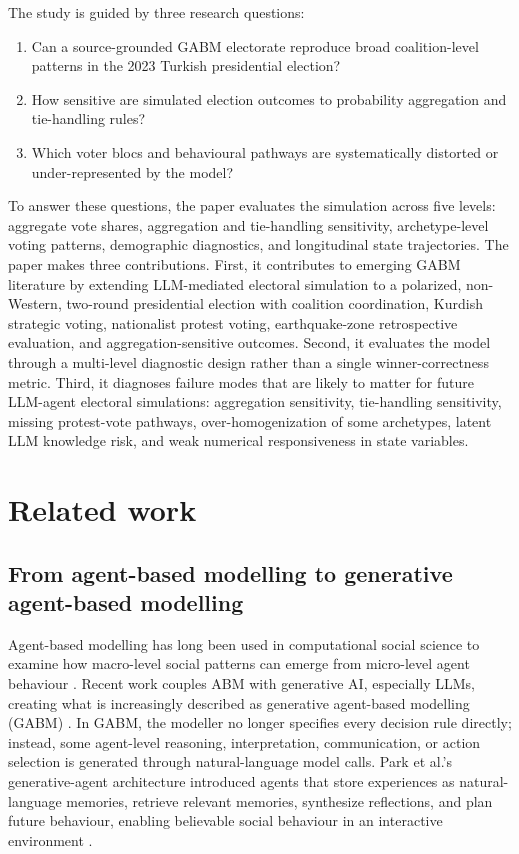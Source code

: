\documentclass[pdflatex,sn-mathphys-num,iicol]{sn-jnl}
\begin{document}
The study is guided by three research questions:
\begin{enumerate}
\item Can a source-grounded GABM electorate reproduce broad coalition-level
      patterns in the 2023 Turkish presidential election?
\item How sensitive are simulated election outcomes to probability aggregation
      and tie-handling rules?
\item Which voter blocs and behavioural pathways are systematically distorted
      or under-represented by the model?
\end{enumerate}
To answer these questions, the paper evaluates the simulation across five
levels: aggregate vote shares, aggregation and tie-handling sensitivity,
archetype-level voting patterns, demographic diagnostics, and longitudinal state
trajectories. The paper makes three contributions. First, it contributes to
emerging GABM literature by extending LLM-mediated electoral simulation to a
polarized, non-Western, two-round presidential election with coalition
coordination, Kurdish strategic voting, nationalist protest voting,
earthquake-zone retrospective evaluation, and aggregation-sensitive outcomes.
Second, it evaluates the model through a multi-level diagnostic design rather
than a single winner-correctness metric. Third, it diagnoses failure modes that
are likely to matter for future LLM-agent electoral simulations: aggregation
sensitivity, tie-handling sensitivity, missing protest-vote pathways,
over-homogenization of some archetypes, latent LLM knowledge risk, and weak
numerical responsiveness in state variables.


\section{Related work}\label{sec:related}

\subsection{From agent-based modelling to generative agent-based
modelling}\label{subsec:abm-to-gabm}

Agent-based modelling has long been used in computational social science to
examine how macro-level social patterns can emerge from micro-level agent
behaviour \cite{epstein2006generative,macal2010tutorial}. Recent work couples
ABM with generative AI, especially LLMs, creating what is increasingly
described as generative agent-based modelling (GABM)
\cite{ghaffarzadegan2023gabm,gao2024llmabm,lu2024gabs}. In GABM, the modeller
no longer specifies every decision rule directly; instead, some agent-level
reasoning, interpretation, communication, or action selection is generated
through natural-language model calls. Park et al.'s generative-agent
architecture introduced agents that store experiences as natural-language
memories, retrieve relevant memories, synthesize reflections, and plan future
behaviour, enabling believable social behaviour in an interactive environment
\cite{park2023generative}.
\end{document}
